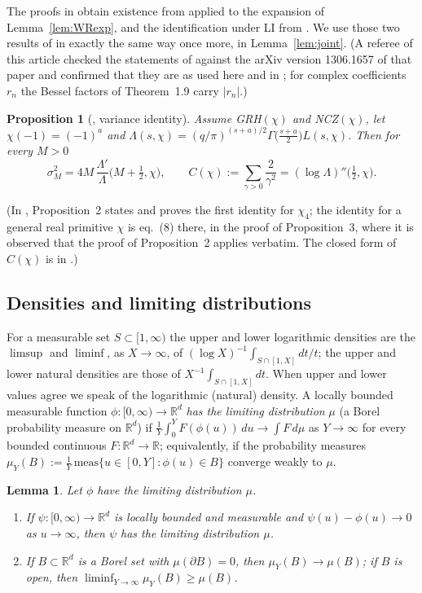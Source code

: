 \documentclass[11pt]{amsart}
\newtheorem{proposition}[theorem]{Proposition}
\newtheorem{lemma}[theorem]{Lemma}
\theoremstyle{definition}
\numberwithin{equation}{section}
\begin{document}
The proofs in \cite{WR} obtain existence from
\cite[Corollary~1.3(a)]{ANS14} applied to the expansion of
Lemma~\ref{lem:WRexp}, and the identification under LI from
\cite[Theorem~1.9]{ANS14}. We use those two results of \cite{ANS14}
in exactly the same way once more, in Lemma~\ref{lem:joint}. (A
referee of this article checked the statements of
\cite[Corollary~1.3(a), Theorems~1.4 and~1.9]{ANS14} against the
arXiv version 1306.1657 of that paper and confirmed that they are as
used here and in \cite{WR}; for complex coefficients $r_n$ the Bessel
factors of Theorem~1.9 carry $|r_n|$.)

\begin{proposition}[{\cite[eq.~(8) and \S2]{WR}}, variance
identity]\label{prop:WRvar}
Assume GRH$(\chi)$ and NCZ$(\chi)$, let $\chi(-1)=(-1)^a$ and
$\Lambda(s,\chi)=(q/\pi)^{(s+a)/2}\Gamma\bigl(\tfrac{s+a}2\bigr)
L(s,\chi)$. Then for every $M>0$
\[
\sigma_M^2=4M\,\frac{\Lambda'}{\Lambda}\bigl(M+\tfrac12,\chi\bigr),
\qquad
C(\chi):=\sum_{\gamma>0}\frac{2}{\gamma^2}
=(\log\Lambda)''\bigl(\tfrac12,\chi\bigr).
\]
\end{proposition}

(In \cite{WR}, Proposition~2 states and proves the first identity for
$\chi_4$; the identity for a general real primitive $\chi$ is eq.~(8)
there, in the proof of Proposition~3, where it is observed that the
proof of Proposition~2 applies verbatim. The closed form of $C(\chi)$
is in \cite[\S2]{WR}.)

\subsection{Densities and limiting distributions}
For a measurable set $S\subset[1,\infty)$ the upper and lower
logarithmic densities are the $\limsup$ and $\liminf$, as
$X\to\infty$, of $(\log X)^{-1}\int_{S\cap[1,X]}dt/t$; the upper and
lower natural densities are those of $X^{-1}\int_{S\cap[1,X]}dt$. When
upper and lower values agree we speak of the logarithmic (natural)
density. A locally bounded measurable function
$\phi:[0,\infty)\to\mathbb R^d$ \emph{has the limiting distribution}
$\mu$ (a Borel probability measure on $\mathbb R^d$) if
$\frac1Y\int_0^YF(\phi(u))\,du\to\int F\,d\mu$ as $Y\to\infty$ for
every bounded continuous $F:\mathbb R^d\to\mathbb R$; equivalently,
if the probability measures $\mu_Y(B):=\frac1Y\,
\mathrm{meas}\{u\in[0,Y]:\phi(u)\in B\}$ converge weakly to $\mu$.

\begin{lemma}\label{lem:stability}
Let $\phi$ have the limiting distribution $\mu$.
\begin{enumerate}
\item[(a)] If $\psi:[0,\infty)\to\mathbb R^d$ is locally bounded and
measurable and $\psi(u)-\phi(u)\to0$ as $u\to\infty$, then $\psi$ has
the limiting distribution $\mu$.
\item[(b)] If $B\subset\mathbb R^d$ is a Borel set with
$\mu(\partial B)=0$, then $\mu_Y(B)\to\mu(B)$; if $B$ is open, then
$\liminf_{Y\to\infty}\mu_Y(B)\ge\mu(B)$.
\end{enumerate}
\end{lemma}
\end{document}
